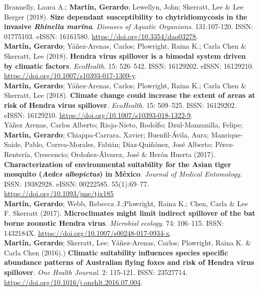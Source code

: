 \documentclass[11pt, letter]{article}
\newcommand{\years}[1]{\marginnote{\scriptsize #1}}
\begin{document}
\years{2018} Brannelly, Laura A.; \textbf{Mart\'in, Gerardo}; Lewellyn, John; Skerratt, Lee \& Lee Berger (2018). \textbf{Size dependant susceptibility to chytridiomycosis in the invasive \emph{Rhinella marina}}. \emph{Diseases of Aquatic Organisms}. 131:107-120. ISSN: 01775103. eISSN: 16161580. \url{ https://doi.org/10.3354/dao03278}.\\

\years{2018} \textbf{Mart\'in, Gerardo}; Y\'a\~nez-Arenas, Carlos; Plowright, Raina K.; Carla Chen \& Skerratt, Lee (2018). \textbf{Hendra virus spillover is a bimodal system driven by climatic factors}. \emph{EcoHealth}. 15: 526–542. ISSN: 16129202. eISSN: 16129210. \url{https://doi.org/10.1007/s10393-017-1309-y}.\\

\years{2018} \textbf{Mart\'in, Gerardo}; Y\'a\~nez-Arenas, Carlos; Plowright, Raina K.; Carla Chen \& Skerratt, Lee (2018). \textbf{Climate change could increase the extent of areas at risk of Hendra virus spillover}. \emph{EcoHealth}. 15: 509–525. ISSN: 16129202. eISSN: 16129210. \url{https://doi.org/10.1007/s10393-018-1322-9}.\\

\years{2017} Y\'a\~nez Arenas, Carlos Alberto; Rioja-Nieto, Rodolfo; Dzul-Manzanilla, Felipe; \textbf{Mart\'in, Gerardo}; Chiappa-Carrara, Xavier; Buenfil-\'Avila, Aura; Manrique-Saide, Pablo, Correa-Morales, Fabi\'an; D\'iaz-Qui\~n\'onez, Jos\'e Alberto; P\'erez-Renter\'ia, Crescencio; Ordo\~nez-\'Alvarez, Jos\'e \& Her\'on Huerta (2017). \textbf{Characterization of environmental suitability for the Asian tiger mosquito (\emph{Aedes albopictus}) in M\'exico}. \emph{Journal of Medical Entomology}. ISSN: 19382928. eISSN: 00222585. 55(1):69–77. \url{https://doi.org/10.1093/jme/tjx185}\\

\years{2017} \textbf{Mart\'in, Gerardo}; Webb, Rebecca J.;Plowright, Raina K.; Chen, Carla  \& Lee F. Skerratt (2017). \textbf{Microclimates might limit indirect spillover of the bat borne zoonotic Hendra virus}. \emph{Microbial ecology}. 74: 106–115. ISSN: 1432184X. \url{https://doi.org/10.1007/s00248-017-0934-x}.\\

\years{2016} \textbf{Mart\'in, Gerardo}; Skerratt, Lee; Y\'a\~nez-Arenas, Carlos; Plowright, Raina K. \& Carla Chen (2016).) \textbf{Climatic suitability influences species specific abundance patterns of Australian flying foxes and risk of Hendra virus spillover}. \emph{One Health Journal}. 2: 115-121. ISSN: 23527714. \url{https://doi.org/10.1016/j.onehlt.2016.07.004}.\\
\end{document}
